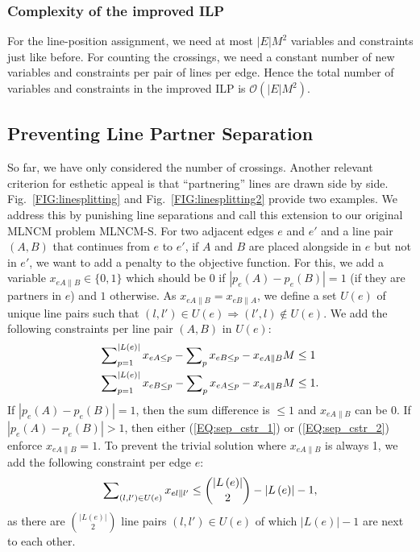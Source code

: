 \documentclass[sigconf]{acmart}
\begin{document}
\subsubsection{Complexity of the improved ILP}

For the line-position assignment, we need at most $|E|M^{2}$ variables and constraints just like before.
For counting the  crossings, we need a constant number of new variables and constraints per pair of lines per edge.
Hence the total number of variables and constraints in the improved ILP is $\mathcal{O}(|E|M^{2})$.

\subsection{Preventing Line Partner Separation}\label{SEC:separation}

So far, we have only considered the number of crossings.
Another relevant criterion for esthetic appeal is that ``partnering'' lines are drawn side by side.
Fig.~\ref{FIG:linesplitting} and Fig.~\ref{FIG:linesplitting2} provide two examples. We address this by punishing line separations and call this extension to our original MLNCM problem \mbox{MLNCM-S}. For two adjacent edges $e$ and $e'$ and a line pair $(A, B)$ that continues from $e$ to $e'$, if $A$ and $B$ are placed alongside in $e$ but not in $e'$, we want to add a penalty to the objective function. For this, we add a variable $x_{eA\|B} \in \{0, 1\}$ which should be $0$ if $\left|p_{e}(A) - p_{e}(B)\right| = 1$ (if they are partners in $e$) and $1$ otherwise. As $x_{eA\|B} = x_{eB\|A}$, we define a set $U(e)$ of unique line pairs such that $(l, l') \in U(e) \Rightarrow (l', l) \not\in U(e)$. We add the following constraints per line pair $(A, B)$ in $U(e)$:
\begin{align}
	\sum\nolimits_{p=1}^{\left|L\left(e\right)\right|} x_{eA\leq p} - \sum\nolimits_{p} x_{eB\leq p} - x_{eA\|B} M &\leq 1 \label{EQ:sep_cstr_1} \\
	\sum\nolimits_{p=1}^{\left|L\left(e\right)\right|} x_{eB\leq p} - \sum\nolimits_{p} x_{eA\leq p} - x_{eA\|B} M &\leq 1. \label{EQ:sep_cstr_2}
\end{align}
If $|p_{e}(A) - p_{e}(B)| = 1$, then the sum difference is $\leq 1$ and $x_{eA\|B}$ can be 0. If $|p_{e}(A) - p_{e}(B)| > 1$, then either (\ref{EQ:sep_cstr_1}) or (\ref{EQ:sep_cstr_2}) enforce $x_{eA\|B} = 1$. To prevent the trivial solution where $x_{eA\|B}$ is always 1, we add the following constraint per edge $e$:
\begin{align}
	\sum\nolimits_{(l, l') \in U(e)} x_{el\|l'} \leq \binom{\left|L\left(e\right)\right|}{2} - \left|L\left(e\right)\right| - 1,  \label{EQ:sep_cstr_3}
\end{align}
as there are $\binom{\left|L\left(e\right)\right|}{2}$ line pairs $(l, l') \in U(e)$ of which $\left|L\left(e\right)\right| - 1$ are next to each other.
\end{document}
